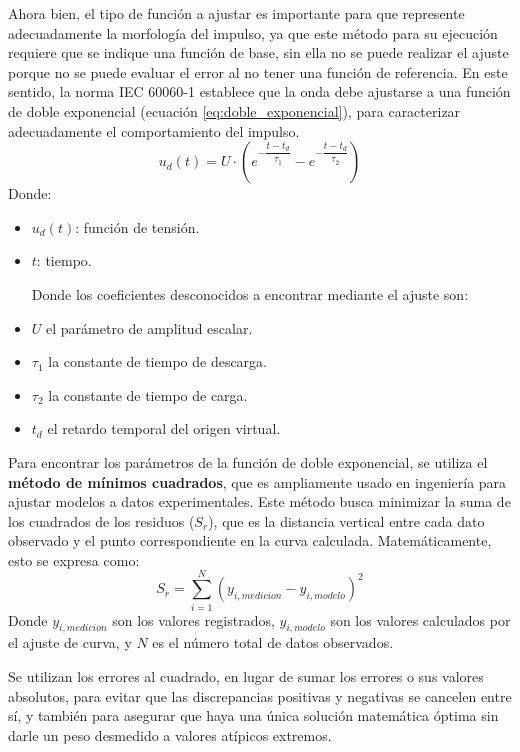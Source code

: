 Ahora bien, el tipo de función a ajustar es importante para que represente adecuadamente la morfología del impulso, ya que este método para su ejecución requiere que se indique una función de base, sin ella no se puede realizar el ajuste porque no se puede evaluar el error al no tener una función de referencia. En este sentido, la norma IEC 60060-1 \cite{iec60060_1} establece que la onda debe ajustarse a una función de doble exponencial (ecuación \ref{eq:doble_exponencial}), para caracterizar adecuadamente el comportamiento del impulso.
\begin{equation}
    u_d(t) = U \cdot \left( e^{-\dfrac{t-t_d}{\tau_1}} - e^{-\dfrac{t-t_d}{\tau_2}} \right)
    \label{eq:doble_exponencial}
\end{equation}
Donde:
\begin{itemize}[label={}, leftmargin=*]
    \item $u_d(t)$: función de tensión.
    \item $t$: tiempo.

    Donde los coeficientes desconocidos a encontrar mediante el ajuste son:
    \item $U$ el parámetro de amplitud escalar.
    \item $\tau_1$ la constante de tiempo de descarga.
    \item $\tau_2$ la constante de tiempo de carga.
    \item $t_d$ el retardo temporal del origen virtual.
\end{itemize}

Para encontrar los parámetros de la función de doble exponencial, se utiliza el \textbf{método de mínimos cuadrados}, que es ampliamente usado en ingeniería para ajustar modelos a datos experimentales.
Este método busca minimizar la suma de los cuadrados de los residuos ($S_r$), que es la distancia vertical entre cada dato observado y el punto correspondiente en la curva calculada. Matemáticamente, esto se expresa como:
\begin{equation}
    S_r = \sum_{i=1}^{N} (y_{i,medicion} - y_{i,modelo})^2
\end{equation}
Donde $y_{i,medicion}$ son los valores registrados, $y_{i,modelo}$ son los valores calculados por el ajuste de curva, y $N$ es el número total de datos observados.

Se utilizan los errores al cuadrado, en lugar de sumar los errores o sus valores absolutos, para evitar que las discrepancias positivas y negativas se cancelen entre sí, y también para asegurar que haya una única solución matemática óptima sin darle un peso desmedido a valores atípicos extremos.


